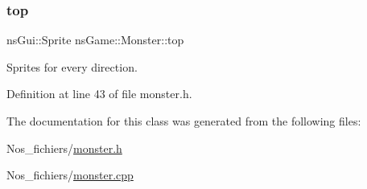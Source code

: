 \subsubsection{\texorpdfstring{top}{top}}
{\footnotesize\ttfamily ns\+Gui\+::\+Sprite ns\+Game\+::\+Monster\+::top}



Sprites for every direction. 



Definition at line 43 of file monster.\+h.



The documentation for this class was generated from the following files\+:\begin{DoxyCompactItemize}
\item 
Nos\+\_\+fichiers/\hyperlink{monster_8h}{monster.\+h}\item 
Nos\+\_\+fichiers/\hyperlink{monster_8cpp}{monster.\+cpp}\end{DoxyCompactItemize}

